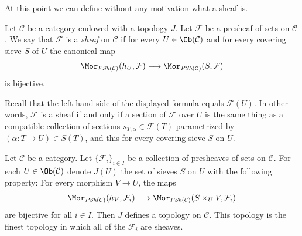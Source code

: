 \noindent
At this point we can define
without any motivation what a sheaf is.

\begin{definition}
\label{definition-sheaf-sets-topology}
Let $\mathcal{C}$ be a category endowed with a
topology $J$. Let $\mathcal{F}$ be a presheaf of sets
on $\mathcal{C}$.
We say that $\mathcal{F}$ is a
{\it sheaf} on $\mathcal{C}$
if for every $U \in \Ob(\mathcal{C})$ and for
every covering sieve $S$ of $U$ the canonical map
$$
\Mor_{\textit{PSh}(\mathcal{C})}(h_U, \mathcal{F})
\longrightarrow
\Mor_{\textit{PSh}(\mathcal{C})}(S, \mathcal{F})
$$
is bijective.
\end{definition}

\noindent
Recall that the left hand side of the displayed
formula equals $\mathcal{F}(U)$. In other words, $\mathcal{F}$
is a sheaf if and only if a section of $\mathcal{F}$
over $U$ is the same thing as a compatible collection of sections
$s_{T, \alpha} \in \mathcal{F}(T)$ parametrized by
$(\alpha : T \to U) \in S(T)$, and this for every covering sieve $S$
on $U$.

\begin{lemma}
\label{lemma-topology-presheaves-sheaves}
Let $\mathcal{C}$ be a category. Let $\{ \mathcal{F}_i \}_{i\in I}$ be a
collection of presheaves of sets on $\mathcal{C}$. For each
$U \in \Ob(\mathcal{C})$ denote
$J(U)$ the set of sieves $S$ on $U$ with the following property:
For every morphism $V \to U$, the maps
$$
\Mor_{\textit{PSh}(\mathcal{C})}(h_V, \mathcal{F}_i)
\longrightarrow
\Mor_{\textit{PSh}(\mathcal{C})}(S \times_U V, \mathcal{F}_i)
$$
are bijective for all $i \in I$. Then $J$ defines a
topology on $\mathcal{C}$. This topology is the finest
topology in which all of the $\mathcal{F}_i$ are sheaves.
\end{lemma}

